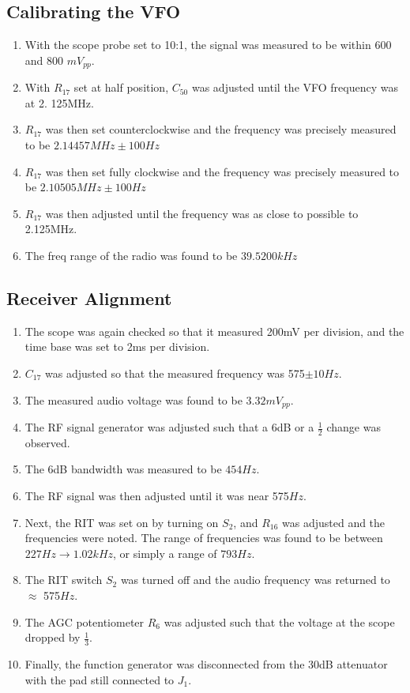 \documentclass{./cls/hw}
\begin{document}
\subsection{Calibrating the VFO}
\begin{enumerate}
  \item With the scope probe set to 10:1, the signal was measured to be within
    600 and 800 $mV_{pp}$.
  \item With $R_{17}$ set at half position, $C_{50}$ was adjusted until the VFO frequency was at 2.
    125MHz.
  \item $R_{17}$ was then set counterclockwise and the frequency was precisely measured
    to be $\boxed{2.14457 MHz\pm 100Hz}$
  \item $R_{17}$ was then set fully clockwise and the frequency was precisely measured
    to be $\boxed{2.10505 MHz\pm 100Hz}$
  \item $R_17$ was then adjusted until the frequency was as close to possible
    to 2.125MHz.
  \item The freq range of the radio was found to be $\boxed{
    39.5200 kHz}$
\end{enumerate}
\subsection{Receiver Alignment}
\begin{enumerate}
  \item The scope was again checked so that it measured 200mV per division,
    and the time base was set to 2ms per division.
  \item $C_{17}$ was adjusted so that the measured frequency was 575$\pm 10Hz$.
  \item The measured audio voltage was found to be $\boxed{3.32 mV_{pp}}$.
  \item The RF signal generator was adjusted such that a 6dB or a $\frac{1}{2}$ change was observed.
  \item The 6dB bandwidth was measured to be $\boxed{454 Hz}$.
  \item The RF signal was then adjusted until it was near 575$Hz$.
  \item Next, the RIT was set on by turning on $S_2$, and $R_16$ was adjusted
    and the frequencies were noted. The range of frequencies was found to be
    between $\boxed{227 Hz \to 1.02kHz}$, or simply a range of $\boxed{793 Hz}$.
  \item The RIT switch $S_2$ was turned off and the audio frequency was
    returned to $\approx$ 575$Hz$.
  \item The AGC potentiometer $R_6$ was adjusted such that the voltage at the
    scope dropped by $\frac{1}{3}$.
  \item Finally, the function generator was disconnected from the 30dB
    attenuator with the pad still connected to $J_1$.
\end{enumerate}
\end{document}
